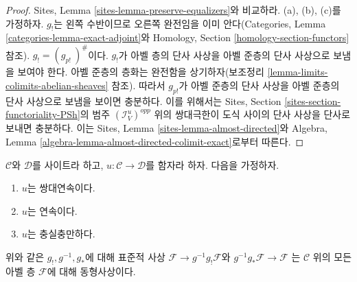 \begin{proof}
Sites, Lemma \ref{sites-lemma-preserve-equalizers}와 비교하라.
(a), (b), (c)를 가정하자. $g_!$는 왼쪽 수반이므로 오른쪽 완전임을
이미 안다(Categories, Lemma \ref{categories-lemma-exact-adjoint}와
Homology, Section \ref{homology-section-functors} 참조).
$g_! = (g_{p!}\ )^\#$이다. $g_!$가 아벨 층의 단사 사상을 아벨
준층의 단사 사상으로 보냄을 보여야 한다. 아벨 준층의 층화는
완전함을 상기하자(보조정리
\ref{lemma-limits-colimits-abelian-sheaves} 참조).
따라서 $g_{p!}$가 아벨 준층의 단사 사상을 아벨 준층의 단사 사상으로
보냄을 보이면 충분하다. 이를 위해서는 Sites, Section
\ref{sites-section-functoriality-PSh}의 범주
$(\mathcal{I}_V^u)^{opp}$ 위의 쌍대극한이 도식 사이의 단사 사상을
단사로 보내면 충분하다. 이는 Sites, Lemma
\ref{sites-lemma-almost-directed}와 Algebra, Lemma
\ref{algebra-lemma-almost-directed-colimit-exact}로부터 따른다.
\end{proof}

\begin{lemma}
\label{lemma-back-and-forth}
$\mathcal{C}$와 $\mathcal{D}$를 사이트라 하고,
$u : \mathcal{C} \to \mathcal{D}$를 함자라 하자. 다음을 가정하자.
\begin{enumerate}
\item[(a)] $u$는 쌍대연속이다.
\item[(b)] $u$는 연속이다.
\item[(c)] $u$는 충실충만하다.
\end{enumerate}
위와 같은 $g_!, g^{-1}, g_*$에 대해 표준적 사상
$\mathcal{F} \to g^{-1}g_!\mathcal{F}$와
$g^{-1}g_*\mathcal{F} \to \mathcal{F}$
는 $\mathcal{C}$ 위의 모든 아벨 층 $\mathcal{F}$에 대해 동형사상이다.
\end{lemma}

